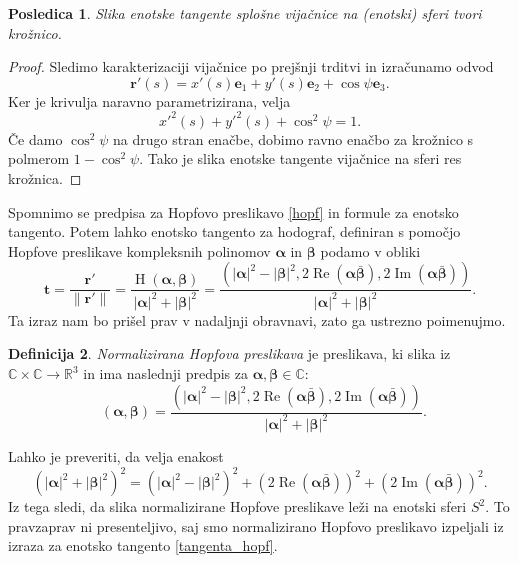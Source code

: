 \documentclass[12pt,a4paper,twoside]{article}
\theoremstyle{definition} %
\newtheorem{definicija}{Definicija}[section]
\theoremstyle{plain} %
\newtheorem{posledica}[definicija]{Posledica}
\theoremstyle{primerstyle}
\numberwithin{equation}{section}  %
\newcommand{\R}{\mathbb R}
\renewcommand{\C}{\mathbb C}
\newcommand{\tV}{\mathbf{t}}
\newcommand{\eV}{\mathbf{e}}
\newcommand{\rV}{\mathbf{r}}
\newcommand{\balpha}{\boldsymbol \alpha}
\newcommand{\bbeta}{\boldsymbol \beta}
\DeclareMathOperator{\hopf}{H}
\DeclareMathOperator{\ReC}{Re}
\DeclareMathOperator{\ImC}{Im}
\DeclareMathOperator{\nhopf}{\hat{H}}
\begin{document}
\begin{posledica}
	\label{vijacnica_slika_tangente}
	Slika enotske tangente splošne vijačnice na (enotski) sferi tvori krožnico.
\end{posledica}
\begin{proof}
	Sledimo karakterizaciji vijačnice po prejšnji trditvi in izračunamo odvod
	\begin{equation*}
		\rV'(s)=x'(s)\eV_1+y'(s)\eV_2+\cos\psi\eV_3.
	\end{equation*}
	Ker je krivulja naravno parametrizirana, velja
	\begin{equation*}
		x'^2(s)+y'^2(s)+\cos^2\psi=1.
	\end{equation*}
	Če damo $\cos^2\psi$ na drugo stran enačbe, dobimo ravno enačbo za krožnico s polmerom $1-\cos^2\psi.$ Tako je slika enotske tangente vijačnice na sferi res krožnica.
\end{proof}

Spomnimo se predpisa za Hopfovo preslikavo \eqref{hopf} in formule za enotsko tangento. Potem lahko enotsko tangento za hodograf, definiran s pomočjo Hopfove preslikave kompleksnih polinomov $\balpha$ in $\bbeta$ podamo v obliki
\begin{equation}
	\label{tangenta_hopf}
	\tV=\frac{\rV'}{\lVert\rV'\rVert}=\frac{\hopf(\balpha,\bbeta)}{|\balpha|^2+|\bbeta|^2}=\frac{(|\balpha|^2-|\bbeta|^2,2\ReC(\balpha\bar{\bbeta}),2\ImC(\balpha\bar{\bbeta}))}{|\balpha|^2+|\bbeta|^2}.
\end{equation}
Ta izraz nam bo prišel prav v nadaljnji obravnavi, zato ga ustrezno poimenujmo.
\begin{definicija}
	\label{norm_hopf_def}
	\emph{Normalizirana Hopfova preslikava} je preslikava, ki slika iz $\C\times\C\to\R^3$ in ima naslednji predpis za $\balpha,\bbeta\in\C:$
	\begin{equation}
		\label{norm_hopf}
		\nhopf(\balpha,\bbeta)=\frac{(|\balpha|^2-|\bbeta|^2,2\ReC(\balpha\bar{\bbeta}),2\ImC(\balpha\bar{\bbeta}))}{|\balpha|^2+|\bbeta|^2}.
	\end{equation}
\end{definicija}
Lahko je preveriti, da velja enakost 
\begin{equation}
	(|\balpha|^2+|\bbeta|^2)^2=(|\balpha|^2-|\bbeta|^2)^2+(2\ReC(\balpha\bar{\bbeta}))^2+(2\ImC(\balpha\bar{\bbeta}))^2.
\end{equation}
Iz tega sledi, da slika normalizirane Hopfove preslikave leži na enotski sferi $S^2.$ To pravzaprav ni presenteljivo, saj smo normalizirano Hopfovo preslikavo izpeljali iz izraza za enotsko tangento \eqref{tangenta_hopf}.
\end{document}
